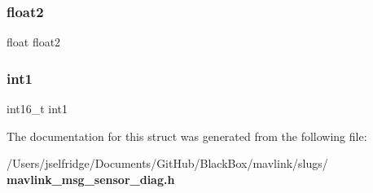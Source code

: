 \subsubsection{float2}
{\footnotesize\ttfamily float float2}

\mbox{\label{struct____mavlink__sensor__diag__t_a28ceb35a4009804c89d14dce3492efb9}} 
\subsubsection{int1}
{\footnotesize\ttfamily int16\+\_\+t int1}



The documentation for this struct was generated from the following file\+:\begin{DoxyCompactItemize}
\item 
/\+Users/jselfridge/\+Documents/\+Git\+Hub/\+Black\+Box/mavlink/slugs/\textbf{ mavlink\+\_\+msg\+\_\+sensor\+\_\+diag.\+h}\end{DoxyCompactItemize}

